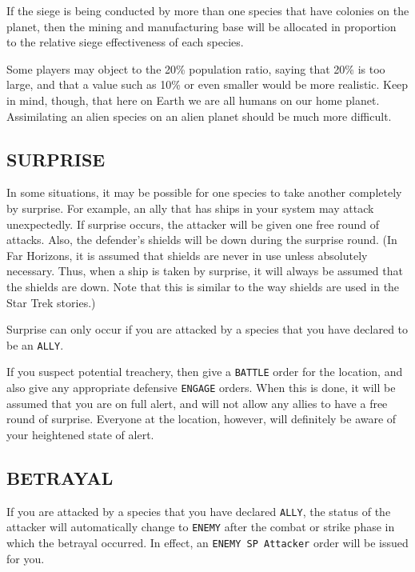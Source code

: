 \documentclass[10pt,titlepage]{article}
\begin{document}
If the siege is being conducted by more than one species that have colonies
on the planet, then the mining and manufacturing base will be allocated in
proportion to the relative siege effectiveness of each species.

Some players may object to the 20\% population ratio, saying that 20\% is too
large, and that a value such as 10\% or even smaller would be more realistic.
Keep in mind, though, that here on Earth we are all humans on our home planet.
Assimilating an alien species on an alien planet should be much more difficult.


\subsection{SURPRISE}
\label{sec:surprise}


In some situations, it may be possible for one species to take another
completely by surprise.  For example, an ally that has ships in your system
may attack unexpectedly.  If surprise occurs, the attacker will be given one
free round of attacks.  Also, the defender's shields will be down during the
surprise round.  (In Far Horizons, it is assumed that shields are never in use
unless absolutely necessary.  Thus, when a ship is taken by surprise, it will
always be assumed that the shields are down.  Note that this is similar to the
way shields are used in the Star Trek stories.)

Surprise can only occur if you are attacked by a species that you have declared
to be an \texttt{ALLY}.

If you suspect potential treachery, then give a \texttt{BATTLE} order for the location,
and also give any appropriate defensive \texttt{ENGAGE} orders.  When this is done,
it will be assumed that you are on full alert, and will not allow any allies
to have a free round of surprise.  Everyone at the location, however, will
definitely be aware of your heightened state of alert.


\subsection{BETRAYAL}
\label{sec:betrayal}


If you are attacked by a species that you have declared \texttt{ALLY}, the status of
the attacker will automatically change to \texttt{ENEMY} after the combat or strike
phase in which the betrayal occurred.  In effect, an \texttt{ENEMY SP Attacker} order
will be issued for you.
\end{document}
